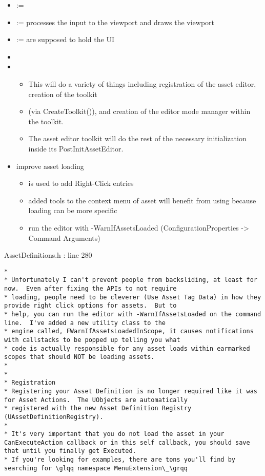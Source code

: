 \begin{itemize}
            \item {} := 
            \item {} := processes the input to the viewport and draws the viewport
            \item {} := are supposed to hold the UI
            \item 
            \item {}
            \begin{itemize}
                \item This will do a variety of things including registration of the asset editor, creation of the toolkit
                \item (via CreateToolkit()), and creation of the editor mode manager within the toolkit.
                \item The asset editor toolkit will do the rest of the necessary initialization inside its PostInitAssetEditor.
            \end{itemize}
            \item improve asset loading
            \begin{itemize}
                \item {} is used to add Right-Click entries
                \item added tools to the context menu of asset will benefit from using  because loading can be more specific
                \item run the editor with -WarnIfAssetsLoaded (ConfigurationProperties -> Command Arguments)
            \end{itemize}

            
        \end{itemize}
        AssetDefinitions.h : line 280
        \begin{lstlisting}
* 
* Unfortunately I can't prevent people from backsliding, at least for now.  Even after fixing the APIs to not require
* loading, people need to be cleverer (Use Asset Tag Data) in how they provide right click options for assets.  But to
* help, you can run the editor with -WarnIfAssetsLoaded on the command line.  I've added a new utility class to the
* engine called, FWarnIfAssetsLoadedInScope, it causes notifications with callstacks to be popped up telling you what
* code is actually responsible for any asset loads within earmarked scopes that should NOT be loading assets.
* 
* 
* Registration
* Registering your Asset Definition is no longer required like it was for Asset Actions.  The UObjects are automatically
* registered with the new Asset Definition Registry (UAssetDefinitionRegistry).
* 
* It's very important that you do not load the asset in your CanExecuteAction callback or in this self callback, you should save that until you finally get Executed.
* If you're looking for examples, there are tons you'll find by searching for \glqq namespace MenuExtension\_\grqq
        \end{lstlisting}
